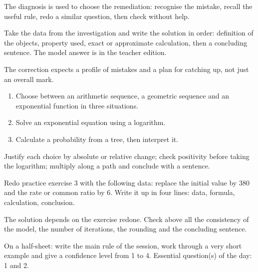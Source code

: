 \begin{summary}The diagnosis is used to choose the remediation: recognise the mistake, recall the useful rule, redo a similar question, then check without help.\end{summary}

\begin{example}
Take the data from the investigation and write the solution in order: definition of the objects, property used, exact or approximate calculation, then a concluding sentence. The model answer is in the teacher edition.
\end{example}
\begin{solution}The correction expects a profile of mistakes and a plan for catching up, not just an overall mark.\end{solution}

\begin{exercise}[essential]
\begin{enumerate}\item Choose between an arithmetic sequence, a geometric sequence and an exponential function in three situations.\item Solve an exponential equation using a logarithm.\item Calculate a probability from a tree, then interpret it.\end{enumerate}
\end{exercise}
\begin{solution}Justify each choice by absolute or relative change; check positivity before taking the logarithm; multiply along a path and conclude with a sentence.\end{solution}


\begin{homework}Redo practice exercise 3 with the following data: replace the initial value by $380$ and the rate or common ratio by $6$. Write it up in four lines: data, formula, calculation, conclusion.\end{homework}
\begin{solution}The solution depends on the exercise redone. Check above all the consistency of the model, the number of iterations, the rounding and the concluding sentence.\end{solution}

\begin{exitticket}[3 minutes]On a half-sheet: write the main rule of the session, work through a very short example and give a confidence level from 1 to 4. Essential question(s) of the day: 1 and 2.\end{exitticket}

